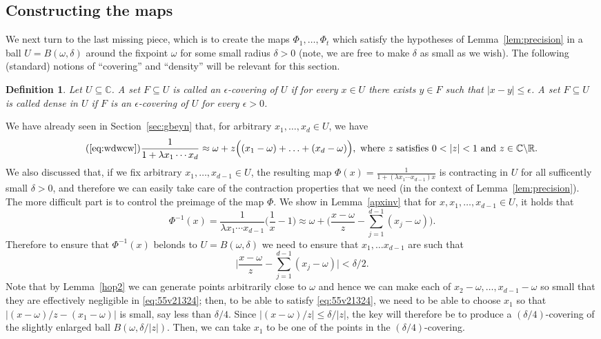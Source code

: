 \documentclass[11pt]{article}
\newtheorem{definition}[theorem]{Definition}
\def\Reals{\mathbb{R}}
\def\Complex{\mathbb{C}}
\newcommand{\eps}{\epsilon}
\begin{document}
\subsection{Constructing the  maps}\label{sec:qzasw}
We next turn to the last missing piece, which is to create the maps $\Phi_1,\hdots,\Phi_t$ which satisfy the hypotheses of  Lemma~\ref{lem:precision} in a ball $U=B(\omega,\delta)$ around the fixpoint $\omega$ for some small radius $\delta>0$ (note, we are free to make $\delta$ as small as we wish). The following (standard) notions of ``covering'' and ``density'' will be relevant for this section.
\begin{definition}
Let $U\subseteq \Complex$. A set $F\subseteq U$ is called an $\eps$-covering of $U$ if for every $x\in U$ there
exists $y\in F$ such that $|x-y|\leq\eps$. A set $F\subseteq U$ is called dense in $U$ if $F$ is an $\eps$-covering of $U$ for every $\epsilon>0$.
\end{definition}
We have already seen in Section~\ref{sec:gbeyn} that,  for arbitrary $x_1,\hdots,x_d\in U$, we have  
\begin{equation*}\tag{\ref{eq:wdwcw}}
\frac{1}{1+\lambda x_1\cdots x_d }\approx\omega+z\Big((x_1-\omega)+\hdots+(x_d-\omega)\Big), \mbox{ where $z$ satisfies $0<|z|<1$ and $z\in \Complex\backslash\Reals$.}
\end{equation*}
We also discussed that, if we fix arbitrary $x_1,\hdots,x_{d-1}\in U$, the resulting map $\Phi(x)=\frac{1}{1+(\lambda x_1\cdots x_{d-1})x}$ is contracting in $U$ for all sufficently small $\delta>0$, and therefore we can easily take care of the contraction properties that we need (in the context of Lemma~\ref{lem:precision}). The more difficult part is to control the preimage of the map $\Phi$. We show in Lemma~\ref{apxinv} that for $x,x_1,\hdots,x_{d-1}\in U$, it holds that 
\[\Phi^{-1}(x)=\frac{1}{\lambda x_1 \cdots x_{d-1}}\Big(\frac{1}{x}-1\Big)\approx \omega + \Big( \frac{x-\omega}{z} - \sum_{j=1}^{d-1} (x_j-\omega) \Big).\]
Therefore to ensure that $\Phi^{-1}(x)$ belonds to $U=B(\omega,\delta)$ we need to ensure that $x_1,\hdots x_{d-1}$ are such that
\begin{equation}\label{eq:55v21324}
\Big| \frac{x-\omega}{z} - \sum_{j=1}^{d-1} (x_j-\omega) \Big|<\delta/2.
\end{equation}
Note that by Lemma~\ref{hop2} we can generate points arbitrarily close to $\omega$ and hence we can make each of $x_2-\omega,\hdots, x_{d-1}-\omega$ so small that they are effectively negligible in  \eqref{eq:55v21324}; then, to be able to satisfy \eqref{eq:55v21324}, we need to be able to choose $x_1$ so that $|(x-\omega)/z-(x_1-\omega)|$ is small, say less than $\delta/4$. Since $|(x-\omega)/z|\leq \delta/|z|$, the key will therefore be to produce a $(\delta/4)$-covering of the  slightly enlarged ball $B(\omega, \delta/|z|)$. Then, we can take $x_1$ to be one of the points in the $(\delta/4)$-covering. 
\end{document}
